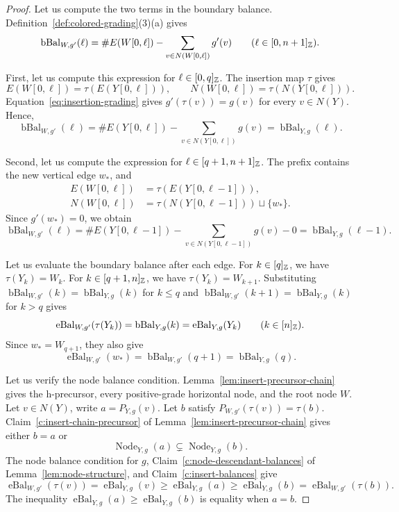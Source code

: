 \begin{proof}
 Let us compute the two terms in the boundary balance.
Definition~\ref{def:colored-grading}(3)(a) gives
\[
 \operatorname{bBal}_{W,g'}(\ell)
 =\#E(W[0,\ell])-\sum_{v\in N(W[0,\ell])}g'(v)
 \qquad(\ell\in[0,n+1]_{\mathbb Z}).
\]

First, let us compute this expression for $\ell\in[0,q]_{\mathbb Z}$.
The insertion map $\tau$ gives
\[
 E(W[0,\ell])=\tau(E(Y[0,\ell])),\qquad
 N(W[0,\ell])=\tau(N(Y[0,\ell])).
\]
Equation~\eqref{eq:insertion-grading} gives $g'(\tau(v))=g(v)$ for every $v\in N(Y)$.
Hence,
\[
 \operatorname{bBal}_{W,g'}(\ell)
 =\#E(Y[0,\ell])-\sum_{v\in N(Y[0,\ell])}g(v)
 =\operatorname{bBal}_{Y,g}(\ell).
\]

Second, let us compute the expression for $\ell\in[q+1,n+1]_{\mathbb Z}$.
The prefix contains the new vertical edge $w_*$, and
\[
 \begin{aligned}
 E(W[0,\ell])&=\tau(E(Y[0,\ell-1])),\\
 N(W[0,\ell])&=\tau(N(Y[0,\ell-1]))\sqcup\{w_*\}.
 \end{aligned}
\]
Since $g'(w_*)=0$, we obtain
\[
 \operatorname{bBal}_{W,g'}(\ell)
 =\#E(Y[0,\ell-1])-\sum_{v\in N(Y[0,\ell-1])}g(v)-0
 =\operatorname{bBal}_{Y,g}(\ell-1).
\]

Let us evaluate the boundary balance after each edge.
For $k\in[q]_{\mathbb Z}$, we have $\tau(Y_k)=W_k$.
For $k\in[q+1,n]_{\mathbb Z}$, we have $\tau(Y_k)=W_{k+1}$.
Substituting $\operatorname{bBal}_{W,g'}(k)=\operatorname{bBal}_{Y,g}(k)$ for $k\le q$ and $\operatorname{bBal}_{W,g'}(k+1)=\operatorname{bBal}_{Y,g}(k)$ for $k>q$ gives
\[
 \operatorname{eBal}_{W,g'}(\tau(Y_k))
 =\operatorname{bBal}_{Y,g}(k)
 =\operatorname{eBal}_{Y,g}(Y_k)\qquad(k\in[n]_{\mathbb Z}).
\]
Since $w_*=W_{q+1}$, they also give
\[
 \operatorname{eBal}_{W,g'}(w_*)
 =\operatorname{bBal}_{W,g'}(q+1)=\operatorname{bBal}_{Y,g}(q).
\]

 Let us verify the node balance condition. Lemma~\ref{lem:insert-precursor-chain} gives the h-precursor, every positive-grade horizontal node, and the root node $W$. Let $v\in N(Y)$, write $a=P_{Y,g}(v)$. Let $b$ satisfy $P_{W,g'}(\tau(v))=\tau(b)$. Claim~\ref{c:insert-chain-precursor} of Lemma~\ref{lem:insert-precursor-chain} gives either $b=a$ or
\[
 \operatorname{Node}_{Y,g}(a)\subsetneq\operatorname{Node}_{Y,g}(b).
\]
The node balance condition for $g$, Claim~\ref{c:node-descendant-balances} of Lemma~\ref{lem:node-structure}, and Claim~\ref{c:insert-balances} give
\[
 \operatorname{eBal}_{W,g'}(\tau(v))
 =\operatorname{eBal}_{Y,g}(v)
 \ge\operatorname{eBal}_{Y,g}(a)
 \ge\operatorname{eBal}_{Y,g}(b)
 =\operatorname{eBal}_{W,g'}(\tau(b)).
\]
The inequality $\operatorname{eBal}_{Y,g}(a)\ge\operatorname{eBal}_{Y,g}(b)$ is equality when $a=b$.


\end{proof}
